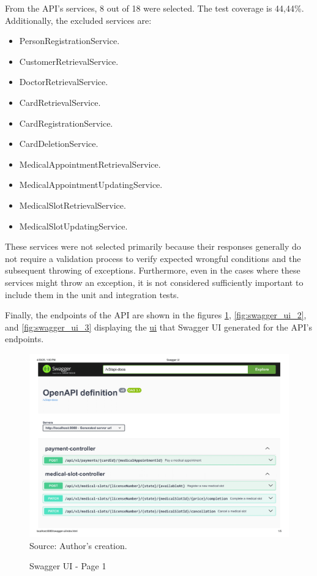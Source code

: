 From the API's services, 8 out of 18 were selected. The test coverage is 44,44\%. Additionally, the excluded services are:

\begin{itemize}
    \item PersonRegistrationService.
    \item CustomerRetrievalService.
    \item DoctorRetrievalService.
    \item CardRetrievalService.
    \item CardRegistrationService.
    \item CardDeletionService.
    \item MedicalAppointmentRetrievalService.
    \item MedicalAppointmentUpdatingService.
    \item MedicalSlotRetrievalService.
    \item MedicalSlotUpdatingService.
\end{itemize}

These services were not selected primarily because their responses generally do not require a validation process to verify expected wrongful conditions and the subsequent throwing of exceptions. Furthermore, even in the cases where these services might throw an exception, it is not considered sufficiently important to include them in the unit and integration tests.

Finally, the endpoints of the API are shown in the figures \ref{fig:swagger_ui_1}, \ref{fig:swagger_ui_2}, and \ref{fig:swagger_ui_3} 
displaying the \hyperref[appendix:glossary]{ui} that Swagger UI generated for the API's endpoints.

	\begin{landscape}
		\begin{figure}[H]
			\centering
			\caption{Swagger UI - Page 1}
			\includegraphics[width=0.83\linewidth]{figures/swagger_ui_1.png}
			\label{fig:swagger_ui_1}
			\\ \footnotesize Source: Author's creation.
		\end{figure}
	\end{landscape}

